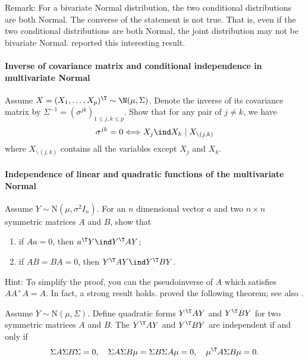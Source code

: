 Remark: 
For a bivariate Normal distribution, the two conditional distributions are both Normal. The converse of the statement is not true. That is, even if the two conditional distributions are both Normal, the joint distribution may not be bivariate Normal. 
\citet{gelman1991note} reported this interesting result. 



\paragraph{Inverse of covariance matrix and conditional independence in multivariate Normal}\label{hwmath2::inverse-cov-conind-normal}


Assume $X = (X_1, \ldots, X_p)^{\T} \sim \N(\mu, \Sigma)$. Denote the inverse of its covariance matrix by $\Sigma^{-1}  = (\sigma^{jk})_{1\leq j, k\leq p}$. Show that for any pair of $j \neq k$, we have 
$$
\sigma^{jk} = 0 \Longleftrightarrow  X_j \ind X_k \mid X_{\backslash (j,k)}
$$
where $X_{\backslash (j,k)}$ contains all the variables except $X_j$ and $X_k$. 


\paragraph{Independence of linear and quadratic functions of the multivariate Normal}\label{hw00math2::independence-linear-quadratic}

Assume $Y\sim\text{N}(\mu,\sigma^{2}I_{n})$. For an $n$ dimensional
vector $a$ and two $n\times n$ symmetric matrices $A$ and $B$, show that
\begin{enumerate}
\item if $ Aa =0$, then $a^{\T}Y\ind Y^{\T}AY$;
\item if $AB=BA=0$, then $Y^{\T}AY\ind Y^{\T}BY$.
\end{enumerate}


Hint: To simplify the proof, you can the pseudoinverse of $A$ which satisfies $AA^{+}A=A$.
In fact, a strong result holds. \citet{ogasawara1951independence} proved the following theorem; see also \citet[][Theorem 5]{styan1970notes}.

\begin{theorem}
Assume $Y\sim\text{N}(\mu,\Sigma )$. Define quadratic forms $Y^{\T}AY$ and $ Y^{\T}BY$ for two symmetric matrices $A$ and $B$. The $Y^{\T}AY$ and $ Y^{\T}BY$ are independent if and only if 
$$
\Sigma A \Sigma B \Sigma = 0,\quad
\Sigma A \Sigma B \mu = \Sigma B \Sigma A \mu = 0,\quad
\mu^{\T} A \Sigma B \mu = 0.
$$
\end{theorem}







